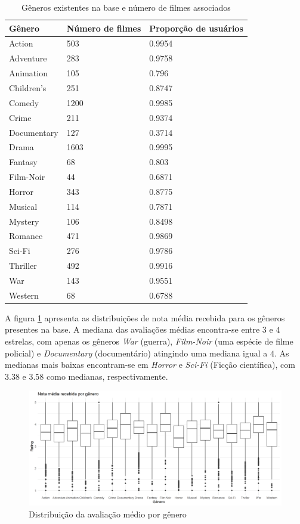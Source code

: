 \documentclass[12pt,a4paper,header]{abnt}
\begin{document}
\begin{table}[!htb]
\caption{Gêneros existentes na base e número de filmes associados}
\label{generos}
\centering
\begin{tabular}{@{}lll@{}}
\\
\toprule
\textbf{Gênero} & \textbf{Número de filmes} & \textbf{Proporção de usuários} \\ \midrule
Action & 503 & 0.9954 \\
Adventure & 283 & 0.9758 \\
Animation & 105 & 0.796 \\
Children's & 251 & 0.8747 \\
Comedy & 1200 & 0.9985 \\
Crime & 211 & 0.9374 \\
Documentary & 127 & 0.3714 \\
Drama & 1603 & 0.9995 \\
Fantasy & 68 & 0.803 \\
Film-Noir & 44 & 0.6871 \\
Horror & 343 & 0.8775 \\
Musical & 114 & 0.7871 \\
Mystery & 106 & 0.8498 \\
Romance & 471 & 0.9869 \\
Sci-Fi & 276 & 0.9786 \\
Thriller & 492 & 0.9916 \\
War & 143 & 0.9551 \\
Western & 68 & 0.6788 \\ \bottomrule
\end{tabular}
\end{table}

A figura \ref{genero_rating_medio} apresenta as distribuições de nota média recebida para os gêneros presentes na base. A mediana das avaliações médias encontra-se entre $3$ e $4$ estrelas, com apenas os gêneros \textit{War} (guerra), \textit{Film-Noir} (uma espécie de filme policial) e \textit{Documentary} (documentário) atingindo uma mediana igual a $4$. As medianas mais baixas encontram-se em \textit{Horror} e \textit{Sci-Fi} (Ficção científica), com $3.38$ e $3.58$ como medianas, respectivamente.

\begin{figure}[h]
\centering
\includegraphics[scale = 0.6]{../R/img/rating_medio_genero.png}
\caption{Distribuição da avaliação médio por gênero}
\label{genero_rating_medio}
\end{figure}
\end{document}
